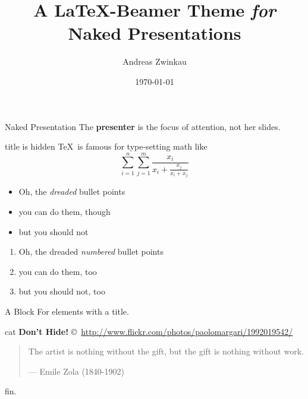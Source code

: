 \documentclass[english,german]{beamer}
\title{A \LaTeX-Beamer Theme {\itshape for} Naked Presentations}
\date{\today}
\author{Andreas Zwinkau}
\begin{document}
\titlepage

\begin{defnframe}{Naked Presentation}
The \textbf{presenter} is the focus of attention,
not her slides.
\end{defnframe}

\begin{frame}{title is hidden}
\TeX\ is famous for type-setting math like \[
   \sum_{i=1}^{n}\sum_{j=1}^{m} 
   \frac{x_i}{x_i + \frac{x_j}{x_i+x_j}}
\]
\end{frame}

\begin{frame}
\begin{itemize}
   \item Oh, the {\itshape dreaded} bullet points
   \item you can do them, though
   \item but you should not
\end{itemize}
\end{frame}

\begin{frame}
\begin{enumerate}
   \item Oh, the dreaded \emph{numbered} bullet points
   \item you can do them, too
   \item but you should not, too
\end{enumerate}
\end{frame}

\begin{frame}
\begin{block}{A Block}
   For elements with a title.
\end{block}
\end{frame}

\begin{imageframe}{cat}
   \color{black}
   {\bf\Large Don't Hide!}
   \vskip6.5cm
   \hfill {\scriptsize\copyright~\url{http://www.flickr.com/photos/paolomargari/1992019542/}}
\end{imageframe}

\begin{frame}
\begin{quote}
   The artist is nothing without the gift, but the gift is nothing without work.

   \hfill--- Emile Zola (1840-1902)
\end{quote}
\end{frame}

\emptyslide

\begin{wordframe}
fin.
\end{wordframe}
\end{document}
